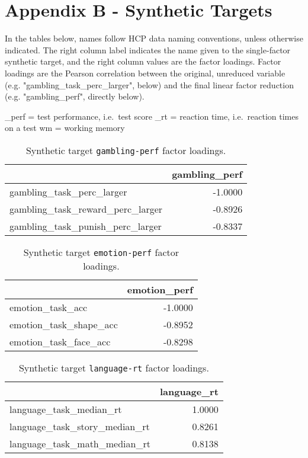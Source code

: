 \documentclass{article}
\begin{document}
\section{Appendix B - Synthetic Targets} \label{sec:appendix-b}


In the tables below, names follow HCP data naming conventions, unless otherwise
indicated. The right column label indicates the name given to the single-factor
synthetic target, and the right column values are the factor loadings. Factor
loadings are the Pearson correlation between the original, unreduced variable
(e.g. "gambling\_task\_perc\_larger", below) and the final linear factor reduction
(e.g. "gambling\_perf", directly below).

\_perf = test performance, i.e.\ test score
\_rt = reaction time, i.e.\ reaction times on a test
wm = working memory

\begin{table}
\centering
\begin{tabular}{lr}
\toprule
 & gambling\_perf \\
\midrule
gambling\_task\_perc\_larger & -1.0000 \\
gambling\_task\_reward\_perc\_larger & -0.8926 \\
gambling\_task\_punish\_perc\_larger & -0.8337 \\
\bottomrule
\end{tabular}

\footnotesize
\caption{Synthetic target \texttt{gambling-perf} factor loadings.}
\normalsize
\label{tab:gambling-perf}
\end{table}


\begin{table}
\centering
\begin{tabular}{lr}
\toprule
 & emotion\_perf \\
\midrule
emotion\_task\_acc & -1.0000 \\
emotion\_task\_shape\_acc & -0.8952 \\
emotion\_task\_face\_acc & -0.8298 \\
\bottomrule
\end{tabular}

\footnotesize
\caption{Synthetic target \texttt{emotion-perf} factor loadings.}
\normalsize
\label{tab:emotion-perf}
\end{table}


\begin{table}
\centering
\begin{tabular}{lr}
\toprule
 & language\_rt \\
\midrule
language\_task\_median\_rt & 1.0000 \\
language\_task\_story\_median\_rt & 0.8261 \\
language\_task\_math\_median\_rt & 0.8138 \\
\bottomrule
\end{tabular}

\footnotesize
\caption{Synthetic target \texttt{language-rt} factor loadings.}
\normalsize
\label{tab:language-rt}
\end{table}
\end{document}
